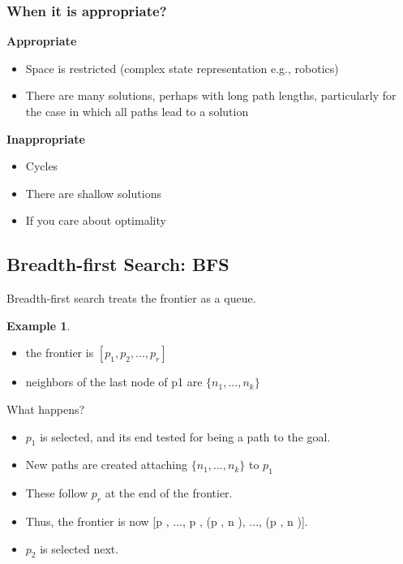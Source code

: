 \documentclass{article}
\theoremstyle{definition}
\theoremstyle{example}
\newtheorem{example}{Example}
\begin{document}
\subsubsection*{When it is appropriate?}
\begin{multicols}{2}
	{\bf Appropriate}
	\begin{itemize}
		\item Space is restricted (complex state representation e.g., robotics)
		\item There are many solutions, perhaps with long path lengths, particularly for the case in which all paths lead to a solution
	\end{itemize}
		{\bf Inappropriate}
		\begin{itemize}
			\item Cycles
			\item There are shallow solutions 
			\item If you care about optimality
		\end{itemize}
\end{multicols}

\subsection*{Breadth-first Search: BFS}
Breadth-first search treats the frontier as a queue.

\begin{example}
	\begin{itemize}
		\item the frontier is $ [p_1,p_2, ..., p_r] $
	\item neighbors of the last node of p1 are $ \{n_1,...,n_k\}  $
\end{itemize}
 What happens?
	
	\begin{itemize}
	\item $ p_1 $ is selected, and its end tested for being a path to the goal.
	\item New paths are created attaching $ \{n_1,...,n_k\}  $ to $ p_1 $
	\item These follow $ p_r $ at the end of the frontier.
	\item Thus, the frontier is now [p , ..., p , (p , n ), ..., (p , n )].
	\item $ p_2 $ is selected next.
\end{itemize}
\end{example}
\end{document}
